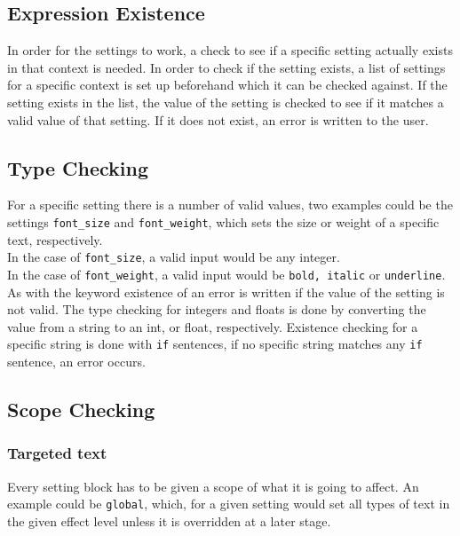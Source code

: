 \subsection{Expression Existence}
In order for the settings to work, a check to see if a specific setting actually exists in that context is needed. In order to check if the setting exists, a list of settings for a specific context is set up beforehand which it can be checked against. If the setting exists in the list, the value of the setting is checked to see if it matches a valid value of that setting. If it does not exist, an error is written to the user.

\subsection{Type Checking}
For a specific setting there is a number of valid values, two examples could be the settings \texttt{font\_size} and \texttt{font\_weight}, which sets the size or weight of a specific text, respectively. \\
In the case of \texttt{font\_size}, a valid input would be any integer. \\
In the case of \texttt{font\_weight}, a valid input would be \texttt{bold, italic} or \texttt{underline}. \\
As with the keyword existence of an error is written if the value of the setting is not valid.
The type checking for integers and floats is done by converting the value from a string to an int, or float, respectively.
Existence checking for a specific string is done with \texttt{if} sentences, if no specific string matches any \texttt{if} sentence, an error occurs.
     
\subsection{Scope Checking}

\subsubsection*{Targeted text}
Every setting block has to be given a scope of what it is going to affect. An example could be \texttt{global}, which, for a given setting would set all types of text in the given effect level unless it is overridden at a later stage.

